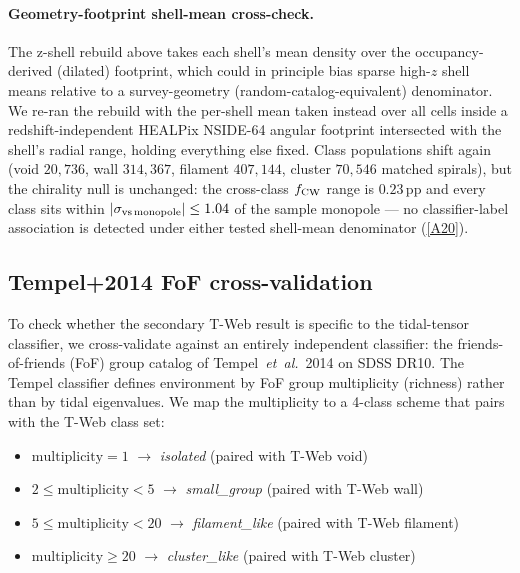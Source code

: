 \documentclass[twocolumn,linenumbers]{aastex702}
\newcommand{\repoBase}{https://github.com/Hubify-Projects/bigbounce/blob/main}
\begin{document}
\paragraph{Geometry-footprint shell-mean cross-check.} The z-shell
rebuild above takes each shell's mean density over the
occupancy-derived (dilated) footprint, which could in principle bias
sparse high-$z$ shell means relative to a survey-geometry
(random-catalog-equivalent) denominator. We re-ran the rebuild with
the per-shell mean taken instead over all cells inside a
redshift-independent HEALPix NSIDE-64 angular footprint intersected
with the shell's radial range, holding everything else fixed. Class
populations shift again (void $20{,}736$, wall $314{,}367$, filament
$407{,}144$, cluster $70{,}546$ matched spirals), but the chirality
null is unchanged: the cross-class $f_{\rm CW}$ range is
$0.23$\,pp and every class sits within $|\sigma_{\rm vs\,monopole}|
\le 1.04$ of the sample monopole — no classifier-label association is
detected under either tested shell-mean denominator
(\href{\repoBase/pipelines/p5\_desi\_chirality/outputs/19\_v0151\_zshell\_geofootprint\_check.json}{[A20]}).

\subsection{Tempel+2014 FoF cross-validation}\label{sec:tempel}

To check whether the secondary T-Web result is specific to the
tidal-tensor classifier, we cross-validate against an entirely
independent classifier: the friends-of-friends (FoF) group catalog of
Tempel~\textit{et~al.}~2014 \cite{Tempel2014} on SDSS DR10. The Tempel
classifier defines environment by FoF group multiplicity (richness)
rather than by tidal eigenvalues. We map the multiplicity to a 4-class
scheme that pairs with the T-Web class set:

\begin{itemize}
\item $\mathrm{multiplicity}\!=\!1$ $\to$ \emph{isolated} (paired with T-Web void)
\item $2 \le \mathrm{multiplicity} < 5$ $\to$ \emph{small\_group} (paired with T-Web wall)
\item $5 \le \mathrm{multiplicity} < 20$ $\to$ \emph{filament\_like} (paired with T-Web filament)
\item $\mathrm{multiplicity} \ge 20$ $\to$ \emph{cluster\_like} (paired with T-Web cluster)
\end{itemize}
\end{document}
